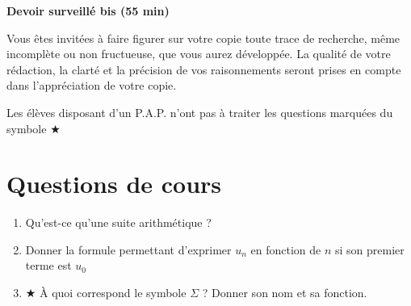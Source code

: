 \documentclass[oneside,12pt]{exam}          %
\begin{document}
\footer{}{\footnotesize \etablissement}{}

\hrulefill\raisebox{-1.9pt}{\quad\decofourleft~\decosix~\decofourright \quad}\hrulefill

\begin{center}
	\textbf{\large Devoir surveillé  bis (55 min)}
\end{center}
\vspace{-5pt}
Vous êtes invité\textperiodcentered e\textperiodcentered s à faire figurer sur votre copie toute trace de recherche, même incomplète ou non fructueuse, que vous aurez développée. La qualité de votre rédaction, la clarté et la précision de vos raisonnements seront prises en compte dans l’appréciation de votre copie.

Les élèves disposant d'un P.A.P. n'ont pas à traiter les questions marquées du symbole $\bigstar$

\vspace{-8pt}\hrulefill\raisebox{-1.9pt}{\quad\decofourleft~\decosix~\decofourright \quad}\hrulefill
\vspace{5pt}



\section{Questions de cours}
\begin{enumerate}[itemsep = 0pt]
	\item Qu'est-ce qu'une suite arithmétique ?
	\item Donner la formule permettant d'exprimer $u_n$ en fonction de $n$ si son premier terme est $u_0$
	\item $\bigstar$ À quoi correspond le symbole $\Sigma$ ? Donner son nom et sa fonction.
\end{enumerate}
\end{document}
